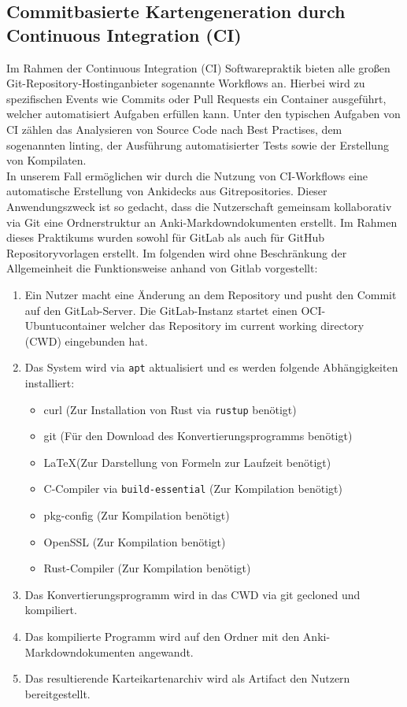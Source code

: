 \documentclass[ngerman]{article}
\begin{document}
\subsection{Commitbasierte Kartengeneration durch Continuous Integration (CI)}
Im Rahmen der Continuous Integration (CI) Softwarepraktik bieten alle großen Git-Repository-Hostinganbieter sogenannte Workflows an. Hierbei wird zu spezifischen Events wie Commits oder Pull Requests ein Container ausgeführt, welcher automatisiert Aufgaben erfüllen kann. Unter den typischen Aufgaben von CI zählen das Analysieren von Source Code nach Best Practises, dem sogenannten linting, der Ausführung automatisierter Tests sowie der Erstellung von Kompilaten.\\

In unserem Fall ermöglichen wir durch die Nutzung von CI-Workflows eine automatische Erstellung von Ankidecks aus Gitrepositories. Dieser Anwendungszweck ist so gedacht, dass die Nutzerschaft gemeinsam kollaborativ via Git eine Ordnerstruktur an Anki-Markdowndokumenten erstellt. Im Rahmen dieses Praktikums wurden sowohl für GitLab \cite{GitlabTemplate} als auch für GitHub \cite{GithubTemplate} Repositoryvorlagen erstellt. Im folgenden wird ohne Beschränkung der Allgemeinheit die Funktionsweise anhand von Gitlab vorgestellt:

\begin{enumerate}
  \item Ein Nutzer macht eine Änderung an dem Repository und pusht den Commit auf den GitLab-Server. Die GitLab-Instanz startet einen OCI-Ubuntucontainer welcher das Repository im current working directory (CWD) eingebunden hat.
  \item Das System wird via \texttt{apt} aktualisiert und es werden folgende Abhängigkeiten installiert:
    \begin{itemize}
      \item curl (Zur Installation von Rust via \texttt{rustup} benötigt)
      \item git (Für den Download des Konvertierungsprogramms benötigt)
      \item \LaTeX (Zur Darstellung von Formeln zur Laufzeit benötigt)
      \item C-Compiler via \texttt{build-essential} (Zur Kompilation benötigt)
      \item pkg-config (Zur Kompilation benötigt)
      \item OpenSSL (Zur Kompilation benötigt)
      \item Rust-Compiler (Zur Kompilation benötigt)
    \end{itemize}
  \item Das Konvertierungsprogramm wird in das CWD via git gecloned und kompiliert.
  \item Das kompilierte Programm wird auf den Ordner mit den Anki-Markdowndokumenten angewandt.
  \item Das resultierende Karteikartenarchiv wird als Artifact den Nutzern bereitgestellt.
\end{enumerate}
\end{document}
